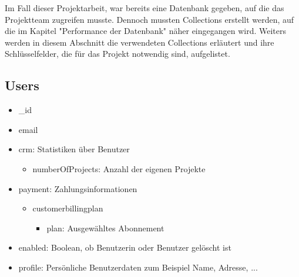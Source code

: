 Im Fall dieser Projektarbeit, war bereits eine Datenbank gegeben, auf die das Projektteam zugreifen musste. Dennoch mussten Collections erstellt werden, auf die im Kapitel "Performance der Datenbank" näher eingegangen wird. Weiters werden in diesem Abschnitt die verwendeten Collections erläutert und ihre Schlüsselfelder, die für das Projekt notwendig sind, aufgelistet.

\subsection{Users}
\begin{itemize}
    \item \_id
    \item email
    \item crm: Statistiken über Benutzer
        \begin{itemize}
            \item numberOfProjects: Anzahl der eigenen Projekte
        \end{itemize}
    \item payment: Zahlungsinformationen
        \begin{itemize}
            \item customerbillingplan
            \begin{itemize}
                \item plan: Ausgewähltes Abonnement
            \end{itemize}
        \end{itemize}
    \item enabled: Boolean, ob Benutzerin oder Benutzer gelöscht ist
    \item profile: Persönliche Benutzerdaten zum Beispiel Name, Adresse, ...
\end{itemize}

